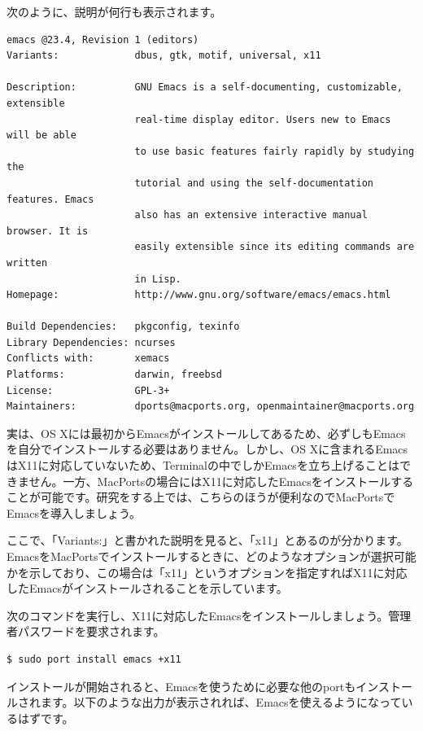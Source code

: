 次のように、説明が何行も表示されます。
\begin{lstlisting}
emacs @23.4, Revision 1 (editors)
Variants:             dbus, gtk, motif, universal, x11

Description:          GNU Emacs is a self-documenting, customizable, extensible
                      real-time display editor. Users new to Emacs will be able
                      to use basic features fairly rapidly by studying the
                      tutorial and using the self-documentation features. Emacs
                      also has an extensive interactive manual browser. It is
                      easily extensible since its editing commands are written
                      in Lisp.
Homepage:             http://www.gnu.org/software/emacs/emacs.html

Build Dependencies:   pkgconfig, texinfo
Library Dependencies: ncurses
Conflicts with:       xemacs
Platforms:            darwin, freebsd
License:              GPL-3+
Maintainers:          dports@macports.org, openmaintainer@macports.org
\end{lstlisting}

実は、OS Xには最初からEmacsがインストールしてあるため、必ずしもEmacsを自分でインストールする必要はありません。しかし、OS Xに含まれるEmacsはX11に対応していないため、Terminalの中でしかEmacsを立ち上げることはできません。一方、MacPortsの場合にはX11に対応したEmacsをインストールすることが可能です。研究をする上では、こちらのほうが便利なのでMacPortsでEmacsを導入しましょう。

ここで、「Variants:」と書かれた説明を見ると、「x11」とあるのが分かります。EmacsをMacPortsでインストールするときに、どのようなオプションが選択可能かを示しており、この場合は「x11」というオプションを指定すればX11に対応したEmacsがインストールされることを示しています。

次のコマンドを実行し、X11に対応したEmacsをインストールしましょう。管理者パスワードを要求されます。

\begin{lstlisting}[language=bash]
$ sudo port install emacs +x11
\end{lstlisting}

インストールが開始されると、Emacsを使うために必要な他のportもインストールされます。以下のような出力が表示されれば、Emacsを使えるようになっているはずです。

